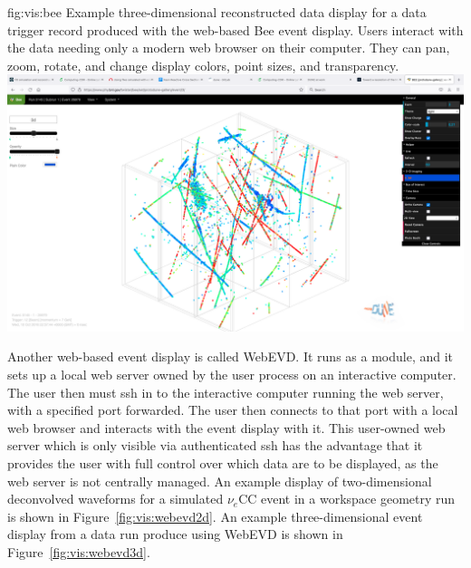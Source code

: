 \documentclass[../main-v1.tex]{subfiles}
\begin{document}
\begin{dunefigure}
{fig:vis:bee} 
{Example three-dimensional reconstructed data display for a  data trigger record produced with the web-based Bee event display.  Users interact with the data needing only a modern web browser on their computer.  They can pan, zoom, rotate, and change display colors, point sizes, and transparency.}
\includegraphics[width=0.9 \textwidth]{graphics/EventDisplays/protodune_bee_evd_light.png}
\end{dunefigure}


Another web-based event display is called WebEVD.  It runs as a  module, and it sets up a local web server owned by the user process on an interactive computer.  The user then must ssh in to the interactive computer running the web server, with a specified port forwarded.  The user then connects to that port with a local web browser and interacts with the event display with it.  This user-owned web server which is only visible via authenticated ssh has the advantage that it provides the user with full control over which data are to be displayed, as the web server is not centrally managed.  An example display of two-dimensional deconvolved waveforms for a simulated $\nu_e$CC event in a  workspace geometry run is shown in Figure~\ref{fig:vis:webevd2d}.  An example three-dimensional event display from a  data run produce using WebEVD is shown in Figure~\ref{fig:vis:webevd3d}.
\end{document}
